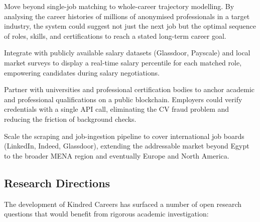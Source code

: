 \documentclass[12pt, a4paper, oneside]{report}
\begin{document}
\begin{description}[leftmargin=2cm, style=nextline, itemsep=8pt]
  \item[Career Path Intelligence]
        Move beyond single-job matching to whole-career trajectory modelling. By analysing
        the career histories of millions of anonymised professionals in a target industry,
        the system could suggest not just the next job but the optimal sequence of roles,
        skills, and certifications to reach a stated long-term career goal.

  \item[Real-Time Salary Benchmarking]
        Integrate with publicly available salary datasets (Glassdoor, Payscale) and local
        market surveys to display a real-time salary percentile for each matched role,
        empowering candidates during salary negotiations.

  \item[Blockchain-Verified Credentials]
        Partner with universities and professional certification bodies to anchor academic
        and professional qualifications on a public blockchain. Employers could verify
        credentials with a single API call, eliminating the CV fraud problem and reducing
        the friction of background checks.

  \item[Global Expansion]
        Scale the scraping and job-ingestion pipeline to cover international job boards
        (LinkedIn, Indeed, Glassdoor), extending the addressable market beyond Egypt to the
        broader MENA region and eventually Europe and North America.
\end{description}

\subsection{Research Directions}
\label{sec:future-research}

The development of Kindred Careers has surfaced a number of open research questions that
would benefit from rigorous academic investigation:
\end{document}
